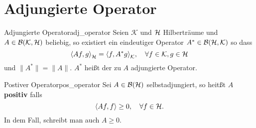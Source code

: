 \section{Adjungierte Operator}

\begin{mytheo}{Adjungierte Operator}{adj_operator}
  Seien $\mathcal{K}$ und $\mathcal{H}$ Hilberträume und $A \in \mathcal{B}(\mathcal{K}, \mathcal{H})$ beliebig, so existiert ein eindeutiger Operator $A^{*} \in \mathcal{B}(\mathcal{H}, \mathcal{K})$ so dass
  \begin{equation}
    {\langle Af, g \rangle}_{\mathcal{H}} = {\langle f, A^{*}g \rangle}_{\mathcal{K}}, \quad \forall f \in \mathcal{K}, g \in \mathcal{H}\label{eq:adj_operator}
  \end{equation}
  und $\| A^{*} \| = \| A \|$.
  $A^{*}$ heißt der zu $A$ adjungierte Operator.
\end{mytheo}

\begin{boringDef}{Postiver Operator}{pos_operator}
  Sei $A \in \mathcal{B}(\mathcal{H})$ selbstadjungiert, so heitßt $A$ \textbf{positiv} falls
  \begin{equation}
    \langle Af, f \rangle \geq 0, \quad \forall f \in \mathcal{H}.\label{eq:pos_operator}
  \end{equation}
  In dem Fall, schreibt man auch $A \geq 0$.
\end{boringDef}
